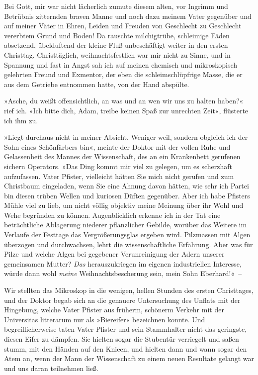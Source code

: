 Bei Gott, mir war nicht lächerlich zumute diesem alten, vor Ingrimm
und Betrübnis zitternden braven Manne und noch dazu meinem Vater
gegenüber und auf meiner Väter in Ehren, Leiden und Freuden von
Geschlecht zu Geschlecht vererbtem Grund und Boden! Da rauschte
milchigtrübe, schleimige Fäden absetzend, übelduftend der kleine
Fluß unbeschäftigt weiter in den ersten Christtag. Christtäglich,
weihnachtsfestlich war mir nicht zu Sinne, und in Spannung und fast
in Angst sah ich auf meinen chemisch und mikroskopisch gelehrten
Freund und Exmentor, der eben die schleimschlüpfrige Masse, die er
aus dem Getriebe entnommen hatte, von der Hand abspülte.

»Asche, du weißt offensichtlich, an was und an wen wir uns zu
halten haben?« rief ich. »Ich bitte dich, Adam, treibe keinen Spaß
zur unrechten Zeit«, flüsterte ich ihm zu.

»Liegt durchaus nicht in meiner Absicht. Weniger weil, sondern
obgleich ich der Sohn eines Schönfärbers bin«, meinte der Doktor
mit der vollen Ruhe und Gelassenheit des Mannes der Wissenschaft,
des an ein Krankenbett gerufenen sichern Operators. »Das Ding kommt
mir viel zu gelegen, um es scherzhaft aufzufassen. Vater Pfister,
vielleicht hätten Sie mich nicht gerufen und zum Christbaum
eingeladen, wenn Sie eine Ahnung davon hätten, wie sehr ich Partei
bin diesen trüben Wellen und kuriosen Düften gegenüber. Aber ich
habe Pfisters Mühle viel zu lieb, um nicht völlig objektiv meine
Meinung über ihr Wohl und Wehe begründen zu können. Augenblicklich
erkenne ich in der Tat eine beträchtliche Ablagerung niederer
pflanzlicher Gebilde, worüber das Weitere im Verlaufe der Festtage
das Vergrößerungsglas ergeben wird. Pilzmassen mit Algen überzogen
und durchwachsen, lehrt die wissenschaftliche Erfahrung. Aber was
für Pilze und welche Algen bei gegebener Verunreinigung der Adern
unserer gemeinsamen Mutter? \emph{Das} herauszukriegen im eigenen
industriellen Interesse, würde dann wohl \emph{meine}
Weihnachtsbescherung sein, mein Sohn Eberhard!«~–

Wir stellten das Mikroskop in die wenigen, hellen Stunden des
ersten Christtages, und der Doktor begab sich an die genauere
Untersuchung des Unflats mit der Hingebung, welche Vater Pfister
aus früherm, schönerm Verkehr mit der Universitas litterarum nur
als »Biereifer« bezeichnen konnte. Und begreiflicherweise taten
Vater Pfister und sein Stammhalter nicht das geringste, diesen
Eifer zu dämpfen. Sie hielten sogar die Stubentür verriegelt und
saßen stumm, mit den Händen auf den Knieen, und hielten dann und
wann sogar den Atem an, wenn der Mann der Wissenschaft zu einem
neuen Resultate gelangt war und uns daran teilnehmen ließ.

